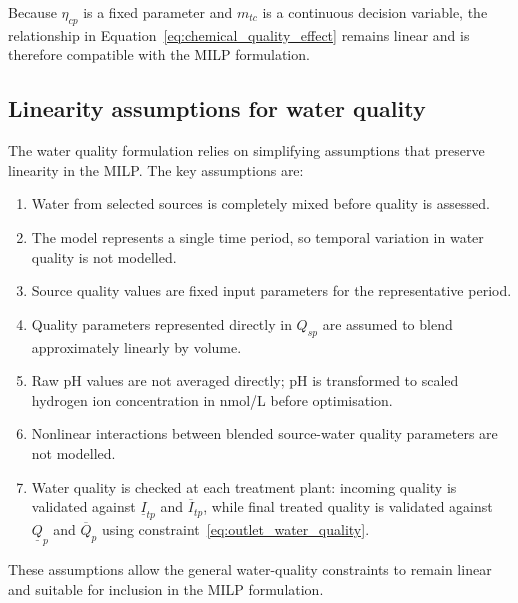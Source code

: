 \documentclass[10pt]{article}
\begin{document}
Because $\eta_{cp}$ is a fixed parameter and $m_{tc}$ is a continuous decision variable, the relationship in Equation~\eqref{eq:chemical_quality_effect} remains linear and is therefore compatible with the MILP formulation.

\subsection{Linearity assumptions for water quality}
\label{sec:model_axiom}

The water quality formulation relies on simplifying assumptions that preserve linearity in the MILP.
The key assumptions are:
\begin{enumerate}[label=(\roman*), align=left, widest=vii]
    \item Water from selected sources is completely mixed before quality is assessed.
    \item The model represents a single time period, so temporal variation in water quality is not modelled.
    \item Source quality values are fixed input parameters for the representative period.
    \item Quality parameters represented directly in $Q_{sp}$ are assumed to blend approximately linearly by volume.
    \item Raw $\mathrm{pH}$ values are not averaged directly; $\mathrm{pH}$ is transformed to scaled hydrogen ion concentration in nmol/L before optimisation.
    \item Nonlinear interactions between blended source-water quality parameters are not modelled.
    \item Water quality is checked at each treatment plant: incoming quality is validated against $\underline{I}_{tp}$ and $\overline{I}_{tp}$, while final treated quality is validated against $\underline{Q}_p$ and $\overline{Q}_p$ using constraint~\eqref{eq:outlet_water_quality}.
\end{enumerate}

These assumptions allow the general water-quality constraints to remain linear and suitable for inclusion in the MILP formulation.
\end{document}

